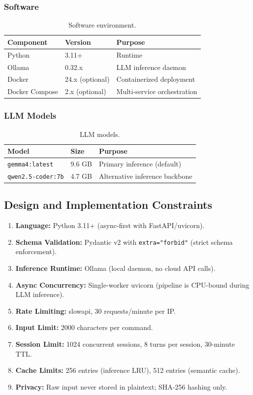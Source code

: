 \documentclass[10pt,journal,onecolumn]{IEEEtran}
\begin{document}
\subsubsection{Software}
\begin{table}[h]
\caption{Software environment.}
\label{tab:software}
\begin{tabularx}{\columnwidth}{l l X}
\toprule
\textbf{Component} & \textbf{Version} & \textbf{Purpose}\\
\midrule
Python & 3.11+ & Runtime\\
Ollama & 0.32.x & LLM inference daemon\\
Docker & 24.x (optional) & Containerized deployment\\
Docker Compose & 2.x (optional) & Multi-service orchestration\\
\bottomrule
\end{tabularx}
\end{table}

\subsubsection{LLM Models}
\begin{table}[h]
\caption{LLM models.}
\label{tab:models}
\begin{tabularx}{\columnwidth}{l l X}
\toprule
\textbf{Model} & \textbf{Size} & \textbf{Purpose}\\
\midrule
\texttt{gemma4:latest} & 9.6 GB & Primary inference (default)\\
\texttt{qwen2.5-coder:7b} & 4.7 GB & Alternative inference backbone\\
\bottomrule
\end{tabularx}
\end{table}

\subsection{Design and Implementation Constraints}
\begin{enumerate}
\item \textbf{Language:} Python 3.11+ (async-first with FastAPI/uvicorn).
\item \textbf{Schema Validation:} Pydantic v2 with \texttt{extra="forbid"} (strict schema enforcement).
\item \textbf{Inference Runtime:} Ollama (local daemon, no cloud API calls).
\item \textbf{Async Concurrency:} Single-worker uvicorn (pipeline is CPU-bound during LLM inference).
\item \textbf{Rate Limiting:} slowapi, 30 requests/minute per IP.
\item \textbf{Input Limit:} 2000 characters per command.
\item \textbf{Session Limit:} 1024 concurrent sessions, 8 turns per session, 30-minute TTL.
\item \textbf{Cache Limits:} 256 entries (inference LRU), 512 entries (semantic cache).
\item \textbf{Privacy:} Raw input never stored in plaintext; SHA-256 hashing only.
\end{enumerate}
\end{document}
